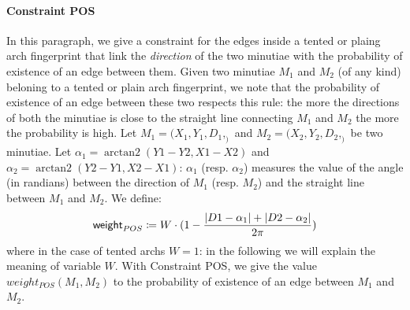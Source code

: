 \documentclass[8pt]{article}
\DeclareMathOperator{\arctantwo}{arctan2}
\begin{document}
\paragraph{Constraint POS}
In this paragraph, we give a constraint for the edges inside a tented
or plaing arch fingerprint that link the \emph{direction} of the two
minutiae with the probability of existence of an edge between them.
Given two minutiae $M_1$ and $M_2$ (of any kind) beloning to a tented 
or plain arch fingerprint,
we note that the probability of existence of an edge between these two
respects this rule: the more the directions of both the minutiae
is close to the straight line connecting $M_1$ and $M_2$ the more the
probability is high.
Let $M_1=(X_1,Y_1,D_1,_)$ and $M_2=(X_2,Y_2,D_2,_)$ be two minutiae.
Let $\alpha_1=\arctantwo(Y1-Y2,X1-X2)$ and $\alpha_2=\arctantwo(Y2-Y1,X2-X1)$:
$\alpha_1$ (resp. $\alpha_2$) measures the value of the angle (in randians) between 
the direction of $M_1$ (resp. $M_2$) and the straight line between $M_1$ and
$M_2$.
We define:
  \begin{align*}
    \textsf{weight}_{POS} \coloneqq
    W \cdot (1-\frac{\lvert D1-\alpha_1\rvert+\lvert D2-\alpha_2\rvert}{2\pi})
  \end{align*}
where in the case of tented archs $W=1$: in the following we will explain the
meaning of variable $W$.
With Constraint POS, we give the value $weight_{POS}(M_1,M_2)$ to the probability 
of existence of an edge between $M_1$ and $M_2$.
\end{document}
